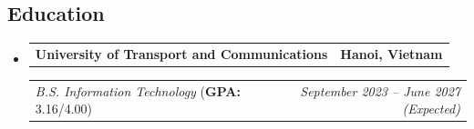 \documentclass[11pt,letterpaper]{article}
\makeatletter
\newcommand{\headerrow}[2]
    {\begin{tabular*}{\linewidth}{l@{\extracolsep{\fill}}r}
      #1 &
      #2 \\
    \end{tabular*}}
\makeatother
\begin{document}
      \subsection*{\Large Education}
      \begin{itemize}[leftmargin=1em]
        \parskip=0.1em
        \item
        \headerrow
        {\textbf{University of Transport and Communications}}
        {\textbf{Hanoi, Vietnam}}
        \headerrow
        {\emph{B.S. Information Technology} (\textbf{GPA:} 3.16/4.00)}
        {\emph{September 2023 -- June 2027 (Expected)}}
      \end{itemize}
    
\end{document}
